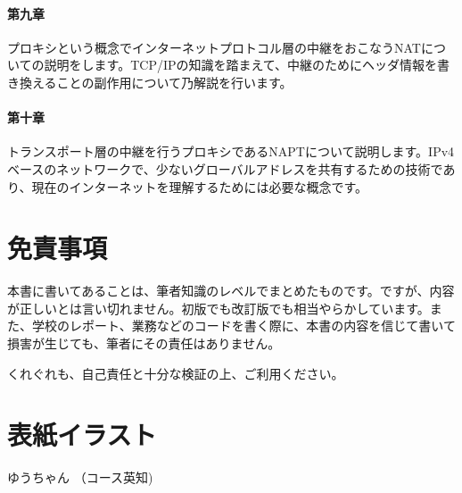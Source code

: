 \paragraph{第九章}
プロキシという概念でインターネットプロトコル層の中継をおこなうNATについての説明をします。TCP/IPの知識を踏まえて、中継のためにヘッダ情報を書き換えることの副作用について乃解説を行います。



\paragraph{第十章}
トランスポート層の中継を行うプロキシであるNAPTについて説明します。IPv4ベースのネットワークで、少ないグローバルアドレスを共有するための技術であり、現在のインターネットを理解するためには必要な概念です。


\section*{免責事項}
本書に書いてあることは、筆者知識のレベルでまとめたものです。ですが、内容が正しいとは言い切れません。初版でも改訂版でも相当やらかしています。また、学校のレポート、業務などのコードを書く際に、本書の内容を信じて書いて損害が生じても、筆者にその責任はありません。

くれぐれも、自己責任と十分な検証の上、ご利用ください。

\section*{表紙イラスト}
ゆうちゃん （コース英知)